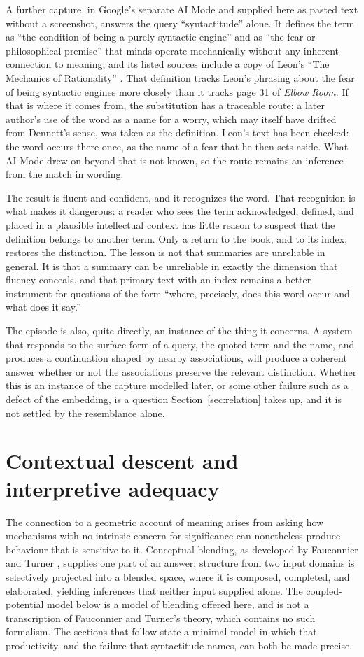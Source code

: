 \documentclass[11pt]{article}
\begin{document}
A further capture, in Google's separate AI Mode and supplied here as pasted text without a screenshot, answers the query ``syntactitude'' alone. It defines the term as ``the condition of being a purely syntactic engine'' and as ``the fear or philosophical premise'' that minds operate mechanically without any inherent connection to meaning, and its listed sources include a copy of Leon's ``The Mechanics of Rationality'' \cite{leon1990}. That definition tracks Leon's phrasing about the fear of being syntactic engines more closely than it tracks page 31 of \emph{Elbow Room}. If that is where it comes from, the substitution has a traceable route: a later author's use of the word as a name for a worry, which may itself have drifted from Dennett's sense, was taken as the definition. Leon's text has been checked: the word occurs there once, as the name of a fear that he then sets aside. What AI Mode drew on beyond that is not known, so the route remains an inference from the match in wording.

The result is fluent and confident, and it recognizes the word. That recognition is what makes it dangerous: a reader who sees the term acknowledged, defined, and placed in a plausible intellectual context has little reason to suspect that the definition belongs to another term. Only a return to the book, and to its index, restores the distinction. The lesson is not that summaries are unreliable in general. It is that a summary can be unreliable in exactly the dimension that fluency conceals, and that primary text with an index remains a better instrument for questions of the form ``where, precisely, does this word occur and what does it say.''

The episode is also, quite directly, an instance of the thing it concerns. A system that responds to the surface form of a query, the quoted term and the name, and produces a continuation shaped by nearby associations, will produce a coherent answer whether or not the associations preserve the relevant distinction. Whether this is an instance of the capture modelled later, or some other failure such as a defect of the embedding, is a question Section~\ref{sec:relation} takes up, and it is not settled by the resemblance alone.

\section{Contextual descent and interpretive adequacy}

The connection to a geometric account of meaning arises from asking how mechanisms with no intrinsic concern for significance can nonetheless produce behaviour that is sensitive to it. Conceptual blending, as developed by Fauconnier and Turner \cite{fauconnier2002}, supplies one part of an answer: structure from two input domains is selectively projected into a blended space, where it is composed, completed, and elaborated, yielding inferences that neither input supplied alone. The coupled-potential model below is a model of blending offered here, and is not a transcription of Fauconnier and Turner's theory, which contains no such formalism. The sections that follow state a minimal model in which that productivity, and the failure that syntactitude names, can both be made precise.
\end{document}
